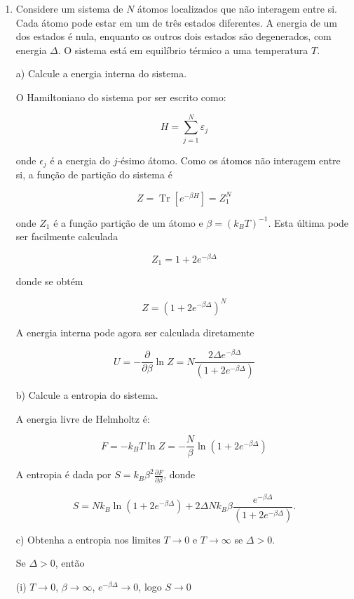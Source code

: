 \begin{enumerate}[start=1,label={\bfseries Q\arabic*.}]
\item Considere um sistema de $N$ átomos localizados que não interagem entre si. Cada átomo pode estar em um de três estados diferentes. A energia de um dos estados é nula, enquanto os outros dois estados são degenerados, com energia $\Delta$. O sistema está em equilíbrio térmico a uma temperatura $T$.



a) Calcule a energia interna do sistema.

{\color{red}

O Hamiltoniano do sistema por ser escrito como:

$$
H=\sum_{j=1}^{N} \varepsilon_{j}
$$

onde $\epsilon_{j}$ é a energia do $j$-ésimo átomo. Como os átomos não interagem entre si, a função de
partição do sistema é

$$
Z = \operatorname{Tr}\left[e^{-\beta H}\right]=Z_{1}^{N}
$$

onde $Z_{1}$ é a função partição de um átomo e $\beta = (k_{B}T)^{-1}$. Esta última pode ser facilmente
calculada

$$
Z_{1}=1+2 e^{-\beta \Delta}
$$

donde se obtém

$$
Z=\left(1+2 e^{-\beta \Delta}\right)^{N}
$$

A energia interna pode agora ser calculada diretamente

$$
U=-\frac{\partial}{\partial \beta} \ln Z=N \frac{2 \Delta e^{-\beta \Delta}}{\left(1+2 e^{-\beta \Delta}\right)}
$$

}

b) Calcule a entropia do sistema.
{\color{red}

A energia livre de Helmholtz é:

$$
F=-k_{B} T \ln Z=-\frac{N}{\beta} \ln \left(1+2 e^{-\beta \Delta}\right)
$$

A entropia é dada por $S=k_{B} \beta^{2} \frac{\partial F}{\partial \beta}$, donde

$$
S=N k_{B} \ln \left(1+2 e^{-\beta \Delta}\right)+2 \Delta N k_{B} \beta \frac{e^{-\beta \Delta}}{\left(1+2 e^{-\beta \Delta}\right)}.
$$


}

c) Obtenha a entropia nos limites $T \rightarrow  0$ e $T \rightarrow \infty$ se $\Delta > 0$.

{\color{red}
Se $\Delta > 0$, então

(i) $T \rightarrow 0$, $\beta \rightarrow \infty$, $e^{-\beta \Delta} \rightarrow 0$, logo $S \rightarrow 0$

}
\end{enumerate}
